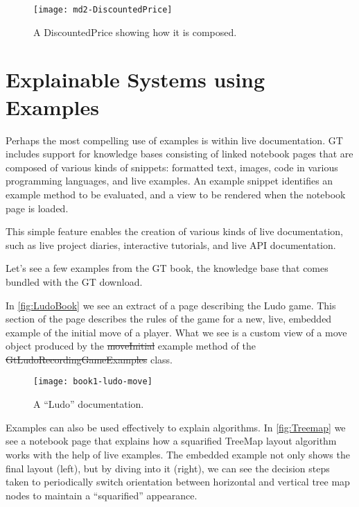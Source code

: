 \documentclass[sigplan,anonymous,review,10pt]{acmart}
\newcommand\ac[1]{\nbc{AC}{#1}{teal}}
\begin{document}
\begin{figure}[h]
  \texttt{[image: md2-DiscountedPrice]}
  \caption{A DiscountedPrice showing how it is composed.}
  \label{fig:DiscountedPrice}
\end{figure}

\section{Explainable Systems using Examples}\label{sec:explainable}



Perhaps the most compelling use of examples is within live documentation.
GT includes support for knowledge bases consisting of linked notebook pages that are composed of various kinds of snippets: formatted text, images, code in various programming languages, and live examples.
An example snippet identifies an example method to be evaluated, and a view to be rendered when the notebook page is loaded.

This simple feature enables the creation of various kinds of live documentation, such as live project diaries, interactive tutorials, and live API documentation.

Let's see a few examples from the GT book, the knowledge base that comes bundled with the GT download.

In \autoref{fig:LudoBook} we see an extract of a page describing the Ludo game.
This section of the page describes the rules of the game for a new, live, embedded example of the initial move of a player.
What we see is a custom view of a move object produced by the \st{moveInitial} example method of the \st{GtLudoRecordingGameExamples} class.

\begin{figure}[h]
  \texttt{[image: book1-ludo-move]}
  \caption{A ``Ludo'' documentation.}
  \label{fig:LudoBook}
\end{figure}

Examples can also be used effectively to explain algorithms.
In \autoref{fig:Treemap} we see a notebook page that explains how a squarified TreeMap layout algorithm works with the help of live examples.
The embedded example not only shows the final layout (left), but by diving into it (right), we can see the decision steps taken to periodically switch orientation between horizontal and vertical tree map nodes to maintain a ``squarified'' appearance.
\end{document}
